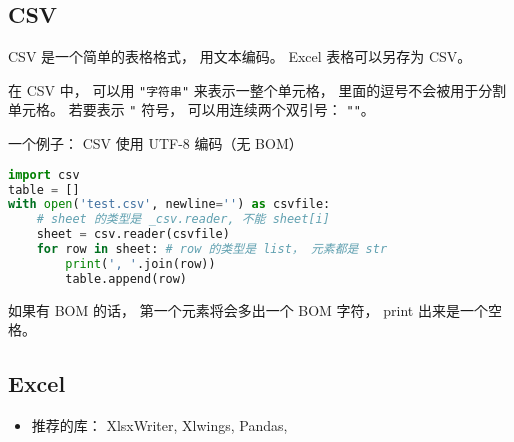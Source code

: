 
\begin{issues}
\issueDraft
\end{issues}


\subsection{CSV}
CSV 是一个简单的表格格式， 用文本编码。 Excel 表格可以另存为 CSV。

在 CSV 中， 可以用 \verb|"字符串"| 来表示一整个单元格， 里面的逗号不会被用于分割单元格。 若要表示 \verb|"| 符号， 可以用连续两个双引号： \verb|""|。

一个例子： CSV 使用 UTF-8 编码（无 BOM）
\begin{lstlisting}[language=python]
import csv
table = []
with open('test.csv', newline='') as csvfile:
    # sheet 的类型是 _csv.reader, 不能 sheet[i]
    sheet = csv.reader(csvfile)
    for row in sheet: # row 的类型是 list， 元素都是 str
        print(', '.join(row))
        table.append(row)
\end{lstlisting}
如果有 BOM 的话， 第一个元素将会多出一个 BOM 字符， print 出来是一个空格。

\subsection{Excel}
\begin{itemize}
\item 推荐的库： XlsxWriter, Xlwings, Pandas, 
\end{itemize}
